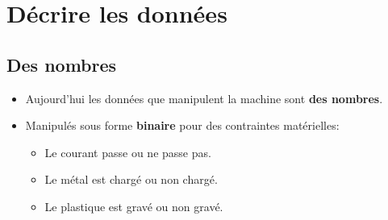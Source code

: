 \section[Décrire]{Décrire les données}
\subsection{Des nombres}

\begin{slide}
	\begin{itemize}
		\item Aujourd'hui les données que manipulent la machine sont \textbf{des nombres}.
		\item Manipulés sous forme \textbf{binaire} pour des contraintes matérielles:
			\begin{itemize}
				\item Le courant passe ou ne passe pas.
				\item Le métal est chargé ou non chargé.
				\item Le plastique est gravé ou non gravé.
			\end{itemize}  
	\end{itemize}
\end{slide}

